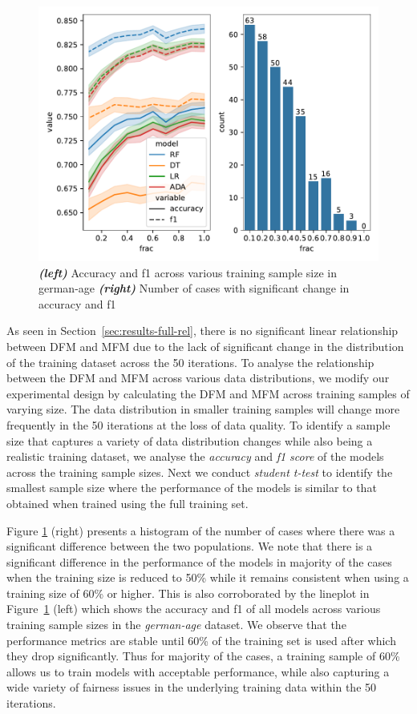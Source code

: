 \documentclass{article}
\begin{document}
\begin{figure}
  \centering
  \includegraphics[width=0.95\linewidth]{training-set-frac-threshold.pdf}
  \caption{\emph{\textbf{(left)}} Accuracy and f1 across various
    training sample size in german-age \emph{\textbf{(right)}} Number
    of cases with significant change in accuracy and f1}
  \label{fig:training-set-frac-threshold}
\end{figure}

As seen in Section \ref{sec:results-full-rel}, there is no significant
linear relationship between DFM and MFM due to the lack of significant
change in the distribution of the training dataset across the 50
iterations. To analyse the relationship between the DFM and MFM across
various data distributions, we modify our experimental design by
calculating the DFM and MFM across training samples of varying size.
The data distribution in smaller training samples will change more
frequently in the 50 iterations at the loss of data quality. To
identify a sample size that captures a variety of data distribution
changes while also being a realistic training dataset, we analyse the
\emph{accuracy} and \emph{f1 score} of the models across the training
sample sizes. Next we conduct \emph{student t-test} to identify the
smallest sample size where the performance of the models is similar to
that obtained when trained using the full training set.

Figure \ref{fig:training-set-frac-threshold} (right) presents a
histogram of the number of cases where there was a significant
difference between the two populations. We note that there is a
significant difference in the performance of the models in majority of
the cases when the training size is reduced to 50\% while it remains
consistent when using a training size of 60\% or higher. This is also
corroborated by the lineplot in
Figure \ref{fig:training-set-frac-threshold} (left) which shows the
accuracy and f1 of all models across various training sample sizes in
the \emph{german-age} dataset. We observe that the performance metrics
are stable until 60\% of the training set is used after which they
drop significantly. Thus for majority of the cases, a training sample
of 60\% allows us to train models with acceptable performance, while
also capturing a wide variety of fairness issues in the underlying
training data within the 50 iterations.
\end{document}
